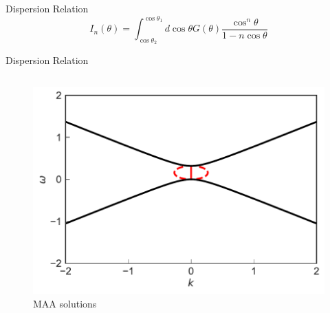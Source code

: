 \documentclass[9pt]{beamer}
\begin{document}
\begin{darkframes}
\begin{frame}{Dispersion Relation}
   \begin{equation*}
      I_n(\theta)=\int_{\cos\theta_2}^{\cos\theta_1} d\cos\theta G(\theta) \frac{\cos^n\theta}{1 - n \cos\theta }
   \end{equation*}





\end{frame}


\begin{frame}{Dispersion Relation}



   \begin{columns}[T]

\begin{column}{0.5\textwidth}
   \begin{figure}
     \includegraphics[width=\linewidth]{assets/dr/spectDBWC1DRDBMAAPltBlob.pdf}
     \caption*{MAA solutions}
  \end{figure}
\end{column}


\end{columns}
\end{frame}
\end{darkframes}
\end{document}
